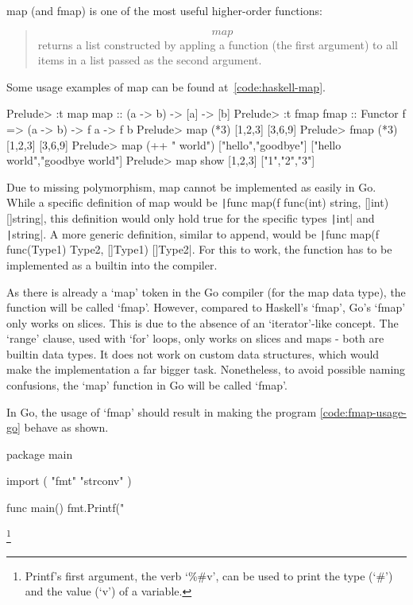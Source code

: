 map (and fmap) is one of the most useful higher-order functions:
\begin{quote}
    \[map\] returns a list constructed by appling a function (the first argument) to all
    items in a list passed as the second argument\autocite{haskell-map}.
\end{quote}

Some usage examples of map can be found at~\ref{code:haskell-map}.

\begin{code}
    \label{code:haskell-map}
    \begin{haskellcode}
Prelude> :t map
map :: (a -> b) -> [a] -> [b]
Prelude> :t fmap
fmap :: Functor f => (a -> b) -> f a -> f b
Prelude> map (*3) [1,2,3]
[3,6,9]
Prelude> fmap (*3) [1,2,3]
[3,6,9]
Prelude> map (++ " world") ["hello","goodbye"]
["hello world","goodbye world"]
Prelude> map show [1,2,3]
["1","2","3"]
    \end{haskellcode}
\end{code}
Due to missing polymorphism, map cannot be implemented as easily in Go. While
a specific definition of map would be
\texttt|func map(f func(int) string, []int) []string|,
this definition would only hold true for the specific types \texttt|int|
and \texttt|string|. A more generic definition, similar to append,
would be \texttt|func map(f func(Type1) Type2, []Type1) []Type2|. For
this to work, the function has to be implemented as a builtin into the compiler.

As there is already a `map' token in the Go compiler (for the map data type),
the function will be called `fmap'. However, compared to Haskell's `fmap',
Go's `fmap' only works on slices. This is due
to the absence of an `iterator'-like concept. The `range' clause, used with
`for' loops, only works on slices and maps - both are builtin data types. It does
not work on custom data structures, which would make the implementation a far
bigger task.
Nonetheless, to avoid possible naming confusions, the `map' function in Go will
be called `fmap'.

In Go, the usage of `fmap' should result in making the program \ref{code:fmap-usage-go}
behave as shown.

\begin{code}
    \label{code:fmap-usage-go}
    \begin{gocode}
package main

import (
  "fmt"
  "strconv"
)

func main() {
  fmt.Printf("%
}
\end{gocode}
\footnote{Printf's first argument, the verb `\%\#v', can be used to print the type
(`\#') and the value (`v') of a variable\autocite{fmt-godoc}.}
\end{code}
